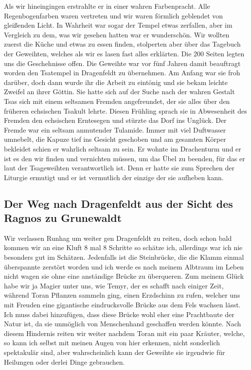Als wir hineingingen erstrahlte er in einer wahren Farbenpracht. Alle Regenbogenfarben waren vertreten und wir waren förmlich geblendet von gleißenden Licht. In Wahrheit war sogar der Tempel etwas zerfallen, aber im Vergleich zu dem, was wir gesehen hatten war er wunderschön. Wir wollten zuerst die Küche und etwas zu essen finden, stolperten aber über das Tagebuch der Geweihten, welches als wir es lasen fast alles erklärten. Die 200 Seiten legten uns die Geschehnisse offen. Die Geweihte war vor fünf Jahren damit beauftragt worden den Tsatempel in Dragenfeldt  zu übernehmen. Am Anfang war sie froh darüber, doch dann wurde ihr die Arbeit zu eintönig und sie bekam leichte Zweifel an ihrer Göttin. Sie hatte sich auf der Suche nach der wahren Gestalt Tsas sich mit einem seltsamen Fremden angefreundet, der sie alles über den früheren echsischen Tsakult lehrte. Diesen Frühling sprach sie in Abwesenheit des Fremden den echsischen Erntesegen und stürzte das Dorf ins Unglück. Der Fremde war ein seltsam anmutender Tulamide. Immer mit viel Duftwasser umnebelt, die Kapuze tief ins Gesicht geschoben und am gesamten Körper bekleidet schien er wahrlich seltsam zu sein. Er wohnte im Drachenturm und er ist es den wir finden und vernichten müssen, um das Übel zu beenden, für das er laut der Tsageweihten verantwortlich ist. Denn er hatte sie zum Sprechen der Liturgie ermutigt und er ist vermutlich der einzige der sie aufheben kann.

\subsection{Der Weg nach Dragenfeldt aus der Sicht des Ragnos zu Grunewaldt}

Wir verlassen Runhag um weiter gen Dragenfeldt  zu reiten, doch schon bald kommen wir an eine Kluft 8 mal 8 Schritte so schätze ich, allerdings war ich nie besonders gut im Schätzen. Jedenfalls ist die Steinbrücke, die die Klamm einmal überspannte zerstört worden und ich werde es nach meinem Albtraum im Leben nicht wagen sie ohne eine anständige Brücke zu überqueren. Zum meinem Glück habe wir ja Magier unter uns, wie Temyr, der es schafft nach einiger Zeit, während Toran Pflanzen sammeln ging, einen Erzdschinn zu rufen, welcher uns mit Freuden eine gigantische
eindrucksvolle Brücke aus dem Fels wachsen lässt. Ich muss dabei hinzufügen, dass diese Brücke wohl eher eine Prachtbaute der Natur ist, da sie unmöglich von Menschenhand geschaffen werden könnte. Nach diesem Hindernis reiten wir weiter nachdem Toran mit ein paar Kräuter, welche, so kann ich selbst mit meinen Augen von hier erkennen, nicht sonderlich spektakulär sind, aber wahrscheinlich kann der Geweihte sie irgendwie für Heilungen oder derlei Dinge gebrauchen.

